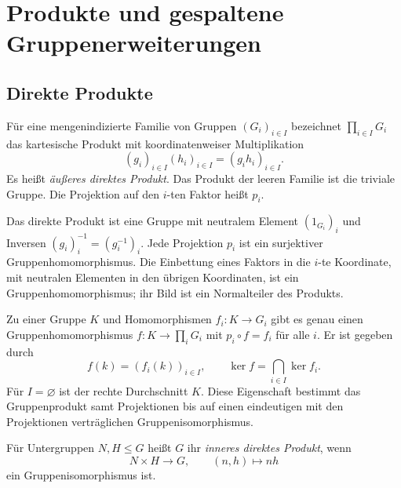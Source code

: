 \chapter{Produkte und gespaltene Gruppenerweiterungen}

\section{Direkte Produkte}

\begin{definition}
\label{b40guide:def:direct-product}
Für eine mengenindizierte Familie von Gruppen $(G_i)_{i\in I}$
bezeichnet $\prod_{i\in I}G_i$ das kartesische Produkt mit
koordinatenweiser Multiplikation
\[
 (g_i)_{i\in I}(h_i)_{i\in I}=(g_ih_i)_{i\in I}.
\]
Es heißt \emph{äußeres direktes Produkt}. Das Produkt der leeren Familie
ist die triviale Gruppe. Die Projektion auf den $i$-ten Faktor heißt $p_i$.
\end{definition}

\begin{theorem}
\label{b40guide:thm:product-group}
Das direkte Produkt ist eine Gruppe mit neutralem Element $(1_{G_i})_i$
und Inversen $(g_i)_i^{-1}=(g_i^{-1})_i$.
Jede Projektion $p_i$ ist ein surjektiver Gruppenhomomorphismus.
Die Einbettung eines Faktors in die $i$-te Koordinate, mit neutralen
Elementen in den übrigen Koordinaten, ist ein Gruppenhomomorphismus;
ihr Bild ist ein Normalteiler des Produkts.
\cite{milne}
\end{theorem}

\begin{theorem}
\label{b40guide:thm:product-universal}
Zu einer Gruppe $K$ und Homomorphismen $f_i:K\to G_i$ gibt es genau
einen Gruppenhomomorphismus $f:K\to\prod_iG_i$ mit $p_i\circ f=f_i$
für alle $i$. Er ist gegeben durch
\[
 f(k)=(f_i(k))_{i\in I},\qquad
 \ker f=\bigcap_{i\in I}\ker f_i.
\]
Für $I=\varnothing$ ist der rechte Durchschnitt $K$.
Diese Eigenschaft bestimmt das Gruppenprodukt samt Projektionen
bis auf einen eindeutigen mit den Projektionen verträglichen
Gruppenisomorphismus.
\cite{milne}
\end{theorem}

\begin{definition}
\label{b40guide:def:internal-direct}
Für Untergruppen $N,H\leq G$ heißt $G$ ihr \emph{inneres direktes Produkt},
wenn
\[
 N\times H\longrightarrow G,\qquad (n,h)\longmapsto nh
\]
ein Gruppenisomorphismus ist.
\end{definition}


